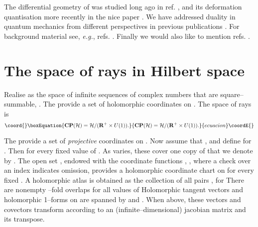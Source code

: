 \documentclass[a4paper,a4paper]{article}
\begin{document}
The differential geometry of \coordHE{} was studied long ago in ref. \cite{CPINF},
and its deformation quantisation more recently in the nice paper \cite{MEX}. 
We have addressed duality in quantum mechanics from different perspectives 
in previous publications \cite{MEPREV}. For background material see, 
{\it e.g.}, refs. \cite{KN, LIBAZCA, LIBSCHLICHENMAIER, BRUZZO}. 
Finally we would also like to mention refs. \cite{MATONE, ANANDAN, FUJII}.


\section{The space of rays in Hilbert space}\label{innter}


Realise \coordHE{} as the space of infinite sequences of complex numbers \coordHE{} that 
are square--summable, \coordHE{}. 
The \coordHE{} provide a set of holomorphic coordinates on \coordHE{}. 
The space of rays \coordHE{} is
\begin{equation}\coord{}\boxEquation{
{\bf CP}({\cal H})={\cal H}/({\bf R}^+\times U(1)).
\label{cph}
}{
{\bf CP}({\cal H})={\cal H}/({\bf R}^+\times U(1)).
}{ecuacion}\coordE{}\end{equation}

The \coordHE{} provide a set of {\it projective}\/ coordinates on \coordHE{}.
Now assume that \coordHE{}, and define \coordHE{} for \coordHE{}. Then 
\coordHE{} for every fixed 
value of \coordHE{}. As \coordHE{} varies, these \coordHE{} cover one copy of \coordHE{} 
that we denote by \coordHE{}. The open set \coordHE{}, endowed with 
the coordinate functions \coordHE{}, \coordHE{}, 
where a check over an index indicates omission, provides a holomorphic coordinate chart 
on \coordHE{} for every fixed \coordHE{}.
A holomorphic atlas is obtained as the collection of all pairs  \coordHE{}, for \coordHE{} There are nonempty \coordHE{}--fold overlaps \coordHE{} 
for all values of \coordHE{} Holomorphic tangent vectors and holomorphic 1--forms 
on \coordHE{} are spanned by \coordHE{} and \coordHE{}. 
When \coordHE{} above, these vectors and covectors transform according to an 
(infinite--dimensional) jacobian matrix and its transpose.
\end{document}
